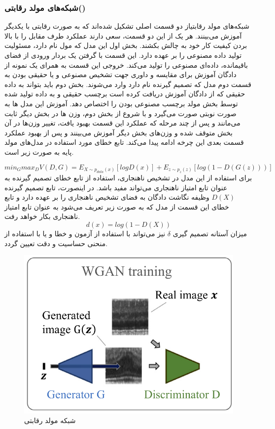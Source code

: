 \documentclass[12pt,a4paper]{report}
\begin{document}
\subsubsection{شبکه‌های مولد رقابتی()}
شبکه‌های مولد رقابتیاز دو قسمت اصلی تشکیل شده‌اند که به صورت رقابتی با یکدیگر آموزش می‌بینند. هر یک از این دو قسمت، سعی دارند عملکرد طرف مقابل را با بالا بردن کیفیت کار خود به چالش بکشند. بخش اول این مدل که مول نام دارد، مسئولیت تولید داده مصنوعی را بر عهده دارد. این قسمت با گرفتن یک بردار ورودی از فضای باقیمانده، داده‌ای مصنوعی را تولید می‌کند. خروجی این قسمت به همرای یک نمونه از دادگان آموزش برای مقایسه و داوری جهت تشخیص مصنوعی و یا حقیقی بودن به قسمت دوم مدل که تصمیم گیرنده نام دارد وارد می‌شوند. بخش دوم باید بتواند به داده حقیقی که از دادگان آموزش دریافت کرده است برچسب حقیقی و به داده تولید شده توسط بخش مولد برچسب مصنوعی بودن را اختصاص دهد. آموزش این مدل ها به صورت نوبتی صورت می‌گیرد و با شروع از بخش دوم، وزن ها در بخش دیگر ثابت می‌مانند و پس از چند مرحله که عملکرد این قسمت بهبود یافت، تغییر وزن‌ها در آن بخش متوقف شده و وزن‌های بخش دیگر آموزش می‌بینند و پس از بهبود عملکرد قسمت بعدی این چرخه ادامه پیدا می‌کند. تابع خطای مورد استفاده در مدل‌های مولد پایه به صورت زیر است.

\begin{equation}
	min_G max_D V(D, G) = E_{X \sim p_{data}(x)}[logD(x)] + E_{z \sim p_z(z)}[log(1-D(G(z)))]
\end{equation}
برای استفاده از این مدل در تشخیص ناهنجاری‌، استفاده از تابع خطای تصمیم گیرنده به عنوان تابع امتیاز ناهنجاری می‌تواند مفید باشد. در اینصورت، تابع تصمیم گیرنده $D(X)$ وظیفه نگاشت دادگان به فضای تشخیص ناهنجاری را بر عهده دارد و تابع خطای این قسمت از مدل که به صورت زیر تعریف می‌شود به عنوان تابع امتیاز ناهنجاری بکار خواهد رفت.
\begin{equation}
d(x) = log(1- D(X))
\end{equation}
 میزان آستانه تصمیم گیری $\delta$ نیز می‌تواند با استفاده از آزمون و خطا و یا با استفاده از منحنی حساسیت و دقت تعیین گردد.\\


\begin{figure}[!h]
	\begin{center}
		\includegraphics[width=0.7\linewidth]{./images/figures/gan.png}
	\end{center}
	\caption{شبکه مولد رقابتی}
	\label{fig:vae}
	\centering
\end{figure}
\end{document}
